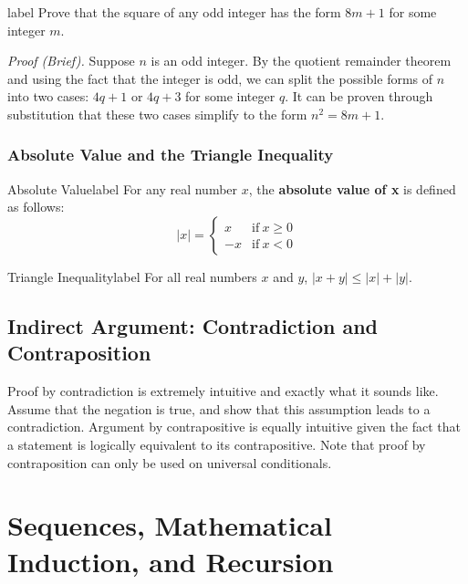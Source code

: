 \documentclass[a4paper]{report}
\begin{document}
\begin{example}{}{label}
    Prove that the square of any odd integer has the form $8m + 1$ for some integer $m$.
\end{example}

\emph{Proof (Brief).} Suppose $n$ is an odd integer. By the quotient remainder theorem and using the fact
that the integer is odd, we can split the possible forms of $n$ into two cases: $4q+1$ or $4q+3$ for
some integer $q$. It can be proven through substitution that these two cases simplify to the form
$n^2=8m+1$.

\subsection{Absolute Value and the Triangle Inequality}

\begin{definition}{Absolute Value}{label}
    For any real number $x$, the \textbf{absolute value of x} is defined as follows: 
    \begin{equation}
        |x| = 
        \begin{cases}
            x & \text{if} \: x \ge 0 \\
            -x & \text{if} \: x < 0
        \end{cases}
    \end{equation}
\end{definition}

\begin{theorem}{Triangle Inequality}{label}
    For all real numbers $x$ and  $y$, $|x + y|  \le  |x| + |y|$.
\end{theorem}

\section{Indirect Argument: Contradiction and Contraposition}

Proof by contradiction is extremely intuitive and exactly what it sounds like. Assume that the negation
is true, and show that this assumption leads to a contradiction. Argument by contrapositive is equally
intuitive given the fact that a statement is logically equivalent to its contrapositive. Note that
proof by contraposition can only be used on universal conditionals.

\chapter{Sequences, Mathematical Induction, and Recursion}
\end{document}
